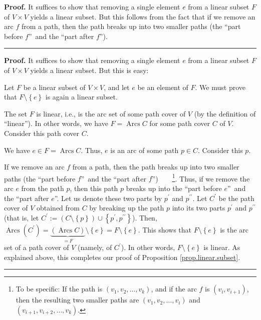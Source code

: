 \documentclass[numbers=enddot,12pt,final,onecolumn,notitlepage]{scrartcl}%
\numberwithin{exer}{section}
\theoremstyle{definition}
\newenvironment{proof}[1][Proof]{\noindent\textbf{#1.} }{\ \rule{0.5em}{0.5em}}
\newenvironment{verlong}{}{}
\newenvironment{vershort}{}{}
\begin{document}
\begin{vershort}


\begin{proof}
It suffices to show that removing a single element $e$ from a linear subset
$F$ of $V\times V$ yields a linear subset. But this follows from the fact that
if we remove an arc $f$ from a path, then the path breaks up into two smaller
paths (the \textquotedblleft part before $f$\textquotedblright\ and the
\textquotedblleft part after $f$\textquotedblright).
\end{proof}
\end{vershort}

\begin{verlong}


\begin{proof}
It suffices to show that removing a single element $e$ from a linear subset
$F$ of $V\times V$ yields a linear subset. But this is easy:

Let $F$ be a linear subset of $V\times V$, and let $e$ be an element of $F$.
We must prove that $F\setminus\left\{  e\right\}  $ is again a linear subset.

The set $F$ is linear, i.e., is the arc set of some path cover of $V$ (by the
definition of \textquotedblleft linear\textquotedblright). In other words, we
have $F=\operatorname*{Arcs}C$ for some path cover $C$ of $V$. Consider this
path cover $C$.

We have $e\in F=\operatorname*{Arcs}C$. Thus, $e$ is an arc of some path $p\in
C$. Consider this $p$.

If we remove an arc $f$ from a path, then the path breaks up into two smaller
paths (the \textquotedblleft part before $f$\textquotedblright\ and the
\textquotedblleft part after $f$\textquotedblright)\ \ \ \ \footnote{To be
specific: If the path is $\left(  v_{1},v_{2},\ldots,v_{k}\right)  $, and if
the arc $f$ is $\left(  v_{i},v_{i+1}\right)  $, then the resulting two
smaller paths are $\left(  v_{1},v_{2},\ldots,v_{i}\right)  $ and $\left(
v_{i+1},v_{i+2},\ldots,v_{k}\right)  $.}. Thus, if we remove the arc $e$ from
the path $p$, then this path $p$ breaks up into the \textquotedblleft part
before $e$\textquotedblright\ and the \textquotedblleft part after
$e$\textquotedblright. Let us denote these two parts by $p^{\prime}$ and
$p^{\prime\prime}$. Let $C^{\prime}$ be the path cover of $V$ obtained from
$C$ by breaking up the path $p$ into its two parts $p^{\prime}$ and
$p^{\prime\prime}$ (that is, let $C^{\prime}:=\left(  C\setminus\left\{
p\right\}  \right)  \cup\left\{  p^{\prime},p^{\prime\prime}\right\}  $).
Then, $\operatorname*{Arcs}\left(  C^{\prime}\right)  =\underbrace{\left(
\operatorname*{Arcs}C\right)  }_{=F}\setminus\left\{  e\right\}
=F\setminus\left\{  e\right\}  $. This shows that $F\setminus\left\{
e\right\}  $ is the arc set of a path cover of $V$ (namely, of $C^{\prime}$).
In other words, $F\setminus\left\{  e\right\}  $ is linear. As explained
above, this completes our proof of Proposition \ref{prop.linear.subset}.
\end{proof}
\end{verlong}
\end{document}
